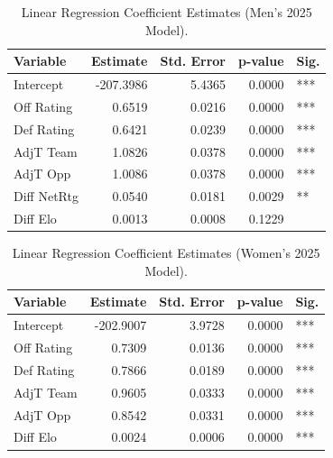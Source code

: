 \documentclass[12pt,leqno]{article}\usepackage[pdftex]{graphicx}\usepackage[dvipsnames]{xcolor}
\theoremstyle{remark}
\begin{document}
\begin{table}[ht]
\centering
\begin{tabular}{lrrrl}
  \hline
Variable & Estimate & Std. Error & p-value & Sig. \\ 
  \hline
Intercept & -207.3986 & 5.4365 & 0.0000 & *** \\ 
  Off Rating & 0.6519 & 0.0216 & 0.0000 & *** \\ 
  Def Rating & 0.6421 & 0.0239 & 0.0000 & *** \\ 
  AdjT Team & 1.0826 & 0.0378 & 0.0000 & *** \\ 
  AdjT Opp & 1.0086 & 0.0378 & 0.0000 & *** \\ 
  Diff NetRtg & 0.0540 & 0.0181 & 0.0029 & ** \\ 
  Diff Elo & 0.0013 & 0.0008 & 0.1229 &  \\ 
   \hline
\end{tabular}
\caption{Linear Regression Coefficient Estimates (Men's 2025 Model).} 
\label{tab:mens_coef_mc}
\end{table}
\begin{table}[ht]
\centering
\begin{tabular}{lrrrl}
  \hline
Variable & Estimate & Std. Error & p-value & Sig. \\ 
  \hline
Intercept & -202.9007 & 3.9728 & 0.0000 & *** \\ 
  Off Rating & 0.7309 & 0.0136 & 0.0000 & *** \\ 
  Def Rating & 0.7866 & 0.0189 & 0.0000 & *** \\ 
  AdjT Team & 0.9605 & 0.0333 & 0.0000 & *** \\ 
  AdjT Opp & 0.8542 & 0.0331 & 0.0000 & *** \\ 
  Diff Elo & 0.0024 & 0.0006 & 0.0000 & *** \\ 
   \hline
\end{tabular}
\caption{Linear Regression Coefficient Estimates (Women's 2025 Model).} 
\label{tab:womens_coef_mc}
\end{table}
\end{document}
